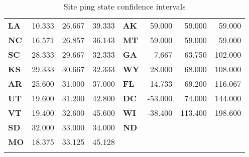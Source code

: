 \begin{longtable}{lrrr|lrrr}
\textbf{LA} &   10.333 &  26.667 &   39.333 & \textbf{AK} &   59.000 &  59.000 &   59.000 \\
\textbf{NC} &   16.571 &  26.857 &   36.143 & \textbf{MT} &   59.000 &  59.000 &   59.000 \\
\textbf{SC} &   28.333 &  29.667 &   32.333 & \textbf{GA} &    7.667 &  63.750 &  102.000 \\
\textbf{KS} &   29.333 &  30.667 &   32.333 & \textbf{WY} &   28.000 &  68.000 &  108.000 \\
\textbf{AR} &   25.600 &  31.000 &   37.000 & \textbf{FL} &  -14.733 &  69.200 &  116.067 \\
\textbf{UT} &   19.600 &  31.200 &   42.800 & \textbf{DC} &  -53.000 &  74.000 &  144.000 \\
\textbf{VT} &   19.400 &  32.600 &   45.600 & \textbf{WI} &  -38.400 & 113.400 &  198.600 \\
\textbf{SD} &   32.000 &  33.000 &   34.000 & \textbf{ND} &          &         &          \\
\textbf{MO} &   18.375 &  33.125 &   45.128 &             &          &         &          \\
\caption{Site ping state confidence intervals}
\label{tab:site_ping_confidence_intervals}
\end{longtable}
